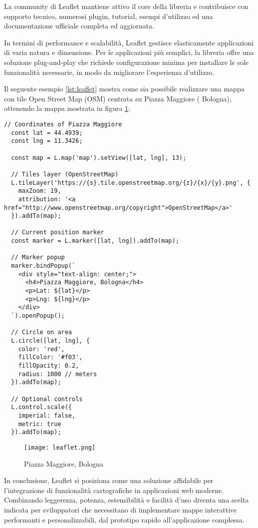 La community di Leaflet mantiene attivo il core della libreria e contribuisce con supporto tecnico, numerosi plugin, tutorial, esempi d'utilizzo ed una documentazione ufficiale completa ed aggiornata.

In termini di performance e scalabilità, Leaflet gestisce elasticamente applicazioni di varia natura e dimensione. Per le applicazioni più semplici, la libreria offre una soluzione plug-and-play che richiede configurazione minima per installare le sole funzionalità necessarie, in modo da migliorare l'esperienza d'utilizzo.

Il seguente esempio \ref{lst:leaflet} mostra come sia possibile realizzare una mappa con tile Open Street Map (OSM) centrata su Piazza Maggiore ( Bologna), ottenendo la mappa mostrata in figura \ref{fig:leaflet}:

\begin{lstlisting}[caption={Mappa Bologna con Leaflet}, label=lst:leaflet]
  // Coordinates of Piazza Maggiore
  const lat = 44.4939;
  const lng = 11.3426;

  const map = L.map('map').setView([lat, lng], 13);

  // Tiles layer (OpenStreetMap)
  L.tileLayer('https://{s}.tile.openstreetmap.org/{z}/{x}/{y}.png', {
    maxZoom: 19,
    attribution: '<a href="http://www.openstreetmap.org/copyright">OpenStreetMap</a>'
  }).addTo(map);

  // Current position marker
  const marker = L.marker([lat, lng]).addTo(map);

  // Marker popup
  marker.bindPopup(`
    <div style="text-align: center;">
      <h4>Piazza Maggiore, Bologna</h4>
      <p>Lat: ${lat}</p>
      <p>Lng: ${lng}</p>
    </div>
  `).openPopup();

  // Circle on area
  L.circle([lat, lng], {
    color: 'red',
    fillColor: '#f03',
    fillOpacity: 0.2,
    radius: 1000 // meters
  }).addTo(map);

  // Optional controls
  L.control.scale({
    imperial: false,
    metric: true
  }).addTo(map);
\end{lstlisting}

\begin{figure}[H]
  \centering
  \texttt{[image: leaflet.png]}
  \caption{Piazza Maggiore, Bologna}
  \label{fig:leaflet}
\end{figure}

In conclusione, Leaflet si posiziona come una soluzione affidabile per l'integrazione di funzionalità cartografiche in applicazioni web moderne. Combinando leggerezza, potenza, estensibilità e facilità d'uso diventa una scelta indicata per sviluppatori che necessitano di implementare mappe interattive performanti e personalizzabili, dal prototipo rapido all'applicazione complessa.

